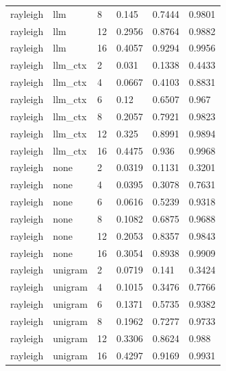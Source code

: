 \begin{tabular}{llllll}
rayleigh & llm & 8 & 0.145 & 0.7444 & 0.9801 \\
rayleigh & llm & 12 & 0.2956 & 0.8764 & 0.9882 \\
rayleigh & llm & 16 & 0.4057 & 0.9294 & 0.9956 \\
rayleigh & llm\_ctx & 2 & 0.031 & 0.1338 & 0.4433 \\
rayleigh & llm\_ctx & 4 & 0.0667 & 0.4103 & 0.8831 \\
rayleigh & llm\_ctx & 6 & 0.12 & 0.6507 & 0.967 \\
rayleigh & llm\_ctx & 8 & 0.2057 & 0.7921 & 0.9823 \\
rayleigh & llm\_ctx & 12 & 0.325 & 0.8991 & 0.9894 \\
rayleigh & llm\_ctx & 16 & 0.4475 & 0.936 & 0.9968 \\
rayleigh & none & 2 & 0.0319 & 0.1131 & 0.3201 \\
rayleigh & none & 4 & 0.0395 & 0.3078 & 0.7631 \\
rayleigh & none & 6 & 0.0616 & 0.5239 & 0.9318 \\
rayleigh & none & 8 & 0.1082 & 0.6875 & 0.9688 \\
rayleigh & none & 12 & 0.2053 & 0.8357 & 0.9843 \\
rayleigh & none & 16 & 0.3054 & 0.8938 & 0.9909 \\
rayleigh & unigram & 2 & 0.0719 & 0.141 & 0.3424 \\
rayleigh & unigram & 4 & 0.1015 & 0.3476 & 0.7766 \\
rayleigh & unigram & 6 & 0.1371 & 0.5735 & 0.9382 \\
rayleigh & unigram & 8 & 0.1962 & 0.7277 & 0.9733 \\
rayleigh & unigram & 12 & 0.3306 & 0.8624 & 0.988 \\
rayleigh & unigram & 16 & 0.4297 & 0.9169 & 0.9931 \\
\hline
\end{tabular}
